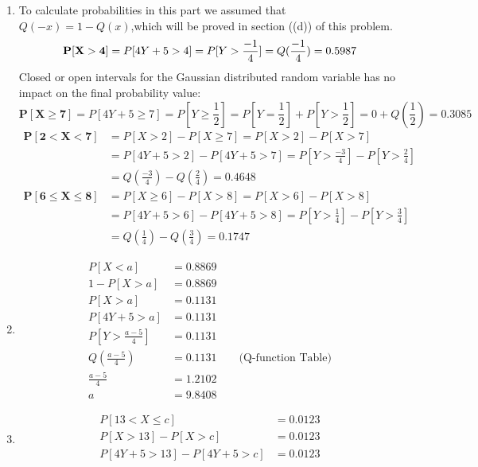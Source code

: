 \documentclass[12pt, letterpaper]{scrartcl}
\begin{document}
\begin{enumerate}[((a))]
    \item To calculate probabilities in this part we assumed that $Q(-x)=1-Q(x)$,which will be proved in section ((d)) of this problem.
    \begin{equation*}
        \mathbf{P[X>4]}=P[4Y+5>4]=P[Y>\frac{-1}{4}]=Q(\frac{-1}{4})=0.5987\\
    \end{equation*}
    Closed or open intervals for the Gaussian distributed random variable has no impact on the final probability value:
    \begin{equation*}
        \mathbf{P[X\geq7]}=P[4Y+5\geq7]=P[Y\geq\frac{1}{2}]=P[Y=\frac{1}{2}] + P[Y>\frac{1}{2}]=0+Q(\frac{1}{2})=0.3085
    \end{equation*}
    \begin{align*}
        \mathbf{P[2<X<7]}&=P[X>2]-P[X\geq7]=P[X>2]-P[X>7]\\
        &=P[4Y+5>2]-P[4Y+5>7]=P[Y>\frac{-3}{4}]-P[Y>\frac{2}{4}]\\
        &=Q(\frac{-3}{4})-Q(\frac{2}{4})=0.4648
    \end{align*}
    \begin{align*}
        \mathbf{P[6\leq X\leq8]}&=P[X\geq6]-P[X>8]=P[X>6]-P[X>8]\\
        &=P[4Y+5>6]-P[4Y+5>8]=P[Y>\frac{1}{4}]-P[Y>\frac{3}{4}]\\
        &=Q(\frac{1}{4})-Q(\frac{3}{4})=0.1747
    \end{align*}
    \item 
    \begin{align*}
        P[X<a]&=0.8869\\
        1-P[X>a]&=0.8869\\
        P[X>a]&=0.1131\\
        P[4Y+5>a]&=0.1131\\
        P[Y>\frac{a-5}{4}]&=0.1131\\
        Q(\frac{a-5}{4})&=0.1131 \qquad \text{(Q-function Table)}\\ 
        \frac{a-5}{4}&=1.2102\\
        a&=9.8408
    \end{align*}
    \item 
    \begin{align*}
        P[13<X\leq c]&=0.0123\\
        P[X>13]-P[X>c]&=0.0123\\
        P[4Y+5>13]-P[4Y+5>c]&=0.0123\\

\end{align*}
\end{enumerate}
\end{document}
